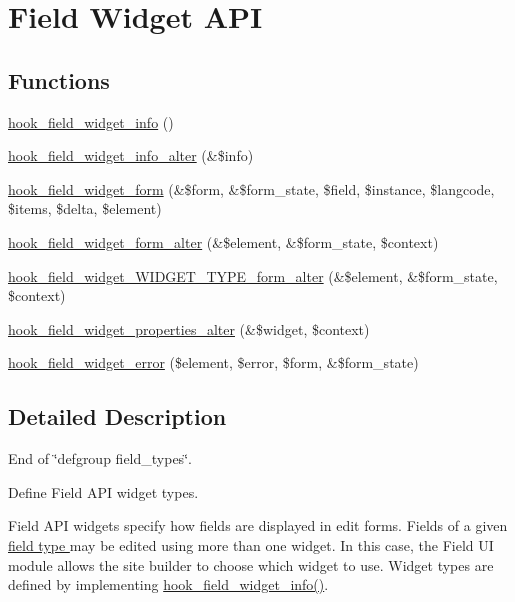 \hypertarget{group__field__widget}{
\section{Field Widget API}
\label{group__field__widget}
}
\subsection*{Functions}
\begin{DoxyCompactItemize}
\item 
\hyperlink{group__field__widget_gac53aa6c2a4ac1215660d25b5d7f20792}{hook\_\-field\_\-widget\_\-info} ()
\item 
\hyperlink{group__field__widget_ga2e74ac1b4b45e9f31b58b86d01892e7e}{hook\_\-field\_\-widget\_\-info\_\-alter} (\&\$info)
\item 
\hyperlink{group__field__widget_gaa9b0e55fd0eb57ac0f9c7c30d251971b}{hook\_\-field\_\-widget\_\-form} (\&\$form, \&\$form\_\-state, \$field, \$instance, \$langcode, \$items, \$delta, \$element)
\item 
\hyperlink{group__field__widget_gaca9d517ab0584fa2428779d8aa24a441}{hook\_\-field\_\-widget\_\-form\_\-alter} (\&\$element, \&\$form\_\-state, \$context)
\item 
\hyperlink{group__field__widget_ga6f53f1874a16e18c27dcc0cc4e7c1ec6}{hook\_\-field\_\-widget\_\-WIDGET\_\-TYPE\_\-form\_\-alter} (\&\$element, \&\$form\_\-state, \$context)
\item 
\hyperlink{group__field__widget_gaa88988bce1ffbec1f481ec7a3ba87e51}{hook\_\-field\_\-widget\_\-properties\_\-alter} (\&\$widget, \$context)
\item 
\hyperlink{group__field__widget_ga9a2031578542fef9e296d79c946431fd}{hook\_\-field\_\-widget\_\-error} (\$element, \$error, \$form, \&\$form\_\-state)
\end{DoxyCompactItemize}


\subsection{Detailed Description}
End of \char`\"{}defgroup field\_\-types\char`\"{}.

Define Field API widget types.

Field API widgets specify how fields are displayed in edit forms. Fields of a given \hyperlink{group__field__types}{field type } may be edited using more than one widget. In this case, the Field UI module allows the site builder to choose which widget to use. Widget types are defined by implementing \hyperlink{group__field__widget_gac53aa6c2a4ac1215660d25b5d7f20792}{hook\_\-field\_\-widget\_\-info()}.

